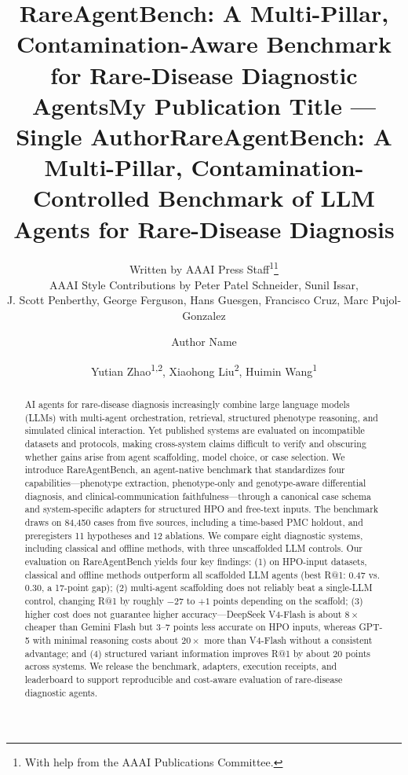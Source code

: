 \documentclass[letterpaper]{article} %
\title{
RareAgentBench: A Multi-Pillar, Contamination-Aware Benchmark for Rare-Disease Diagnostic Agents}
\author{
    Written by AAAI Press Staff\textsuperscript{\rm 1}\thanks{With help from the AAAI Publications Committee.}\\
    AAAI Style Contributions by Peter Patel Schneider,
    Sunil Issar,\\
    J. Scott Penberthy,
    George Ferguson,
    Hans Guesgen,
    Francisco Cruz\equalcontrib\corresponding,
    Marc Pujol-Gonzalez\equalcontrib\corresponding
}
\title{My Publication Title --- Single Author}
\author {
    Author Name
}
\title{RareAgentBench: A Multi-Pillar, Contamination-Controlled Benchmark of LLM Agents for Rare-Disease Diagnosis}
\author {
    Yutian Zhao\textsuperscript{\rm 1,\rm 2}, %
    Xiaohong Liu\textsuperscript{\rm 2},
    Huimin Wang\textsuperscript{\rm 1}\corresponding
}
\begin{document}
\maketitle

\begin{abstract}
AI agents for rare-disease diagnosis increasingly combine large language models (LLMs) with multi-agent orchestration, retrieval, structured phenotype reasoning, and simulated clinical interaction. Yet published systems are evaluated on incompatible datasets and protocols, making cross-system claims difficult to verify and obscuring whether gains arise from agent scaffolding, model choice, or case selection. We introduce RareAgentBench, an agent-native benchmark that standardizes four capabilities---phenotype extraction, phenotype-only and genotype-aware differential diagnosis, and clinical-communication faithfulness---through a canonical case schema and system-specific adapters for structured HPO and free-text inputs. The benchmark draws on 84,450 cases from five sources, including a time-based PMC holdout, and preregisters 11 hypotheses and 12 ablations. We compare eight diagnostic systems, including classical and offline methods, with three unscaffolded LLM controls. Our evaluation on RareAgentBench yields four key findings: (1) on HPO-input datasets, classical and offline methods outperform all scaffolded LLM agents (best R@1: 0.47 vs. 0.30, a 17-point gap); (2) multi-agent scaffolding does not reliably beat a single-LLM control, changing R@1 by roughly $-27$ to $+1$ points depending on the scaffold; (3) higher cost does not guarantee higher accuracy---DeepSeek V4-Flash is about $8\times$ cheaper than Gemini Flash but 3--7 points less accurate on HPO inputs, whereas GPT-5 with minimal reasoning costs about $20\times$ more than V4-Flash without a consistent advantage; and (4) structured variant information improves R@1 by about 20 points across systems. We release the benchmark, adapters, execution receipts, and leaderboard to support reproducible and cost-aware evaluation of rare-disease diagnostic agents.
\end{abstract}

\end{document}
